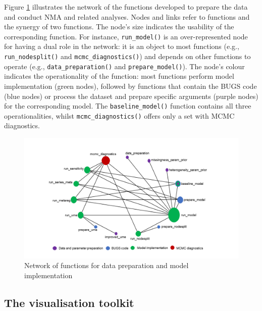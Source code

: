 Figure \ref{fig:network-models} illustrates the network of the functions
developed to prepare the data and conduct NMA and related analyses. Nodes and links
refer to functions and the synergy of two functions. The node's size indicates
the usability of the corresponding function. For instance, \texttt{run\_model()} is an
over-represented node for having a dual role in the network: it is an object
to most functions (e.g., \texttt{run\_nodesplit()} and \texttt{mcmc\_diagnostics()}) and depends
on other functions to operate (e.g., \texttt{data\_preparation()} and \texttt{prepare\_model()}).
The node's colour indicates the operationality of the function: most functions
perform model implementation (green nodes), followed by functions that contain
the BUGS code (blue nodes) or process the dataset and prepare specific arguments
(purple nodes) for the corresponding model. The \texttt{baseline\_model()} function contains
all three operationalities, whilst \texttt{mcmc\_diagnostics()} offers only a set with
MCMC diagnostics.

\begin{figure}
\includegraphics[width=1\linewidth,height=0.3\textheight]{network_models} \caption{Network of functions for data preparation and model implementation}\label{fig:network-models}
\end{figure}

\hypertarget{the-visualisation-toolkit}{%
\subsection{The visualisation toolkit}\label{the-visualisation-toolkit}}

